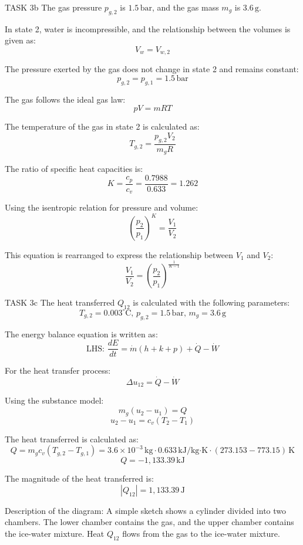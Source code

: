 TASK 3b  
The gas pressure \( p_{g,2} \) is \( 1.5 \, \text{bar} \), and the gas mass \( m_g \) is \( 3.6 \, \text{g} \).  

In state 2, water is incompressible, and the relationship between the volumes is given as:  
\[
V_w = V_{w,2}
\]  

The pressure exerted by the gas does not change in state 2 and remains constant:  
\[
p_{g,2} = p_{g,1} = 1.5 \, \text{bar}
\]  

The gas follows the ideal gas law:  
\[
pV = mRT
\]  

The temperature of the gas in state 2 is calculated as:  
\[
T_{g,2} = \frac{p_{g,2} V_2}{m_g R}
\]  

The ratio of specific heat capacities is:  
\[
K = \frac{c_p}{c_v} = \frac{0.7988}{0.633} = 1.262
\]  

Using the isentropic relation for pressure and volume:  
\[
\left( \frac{p_2}{p_1} \right)^K = \frac{V_1}{V_2}
\]  

This equation is rearranged to express the relationship between \( V_1 \) and \( V_2 \):  
\[
\frac{V_1}{V_2} = \left( \frac{p_2}{p_1} \right)^{\frac{1}{K-1}}
\]  

TASK 3c  
The heat transferred \( Q_{12} \) is calculated with the following parameters:  
\[
T_{g,2} = 0.003^\circ\text{C}, \, p_{g,2} = 1.5 \, \text{bar}, \, m_g = 3.6 \, \text{g}
\]  

The energy balance equation is written as:  
\[
\text{LHS: } \frac{dE}{dt} = \dot{m} (h + k + p) + \dot{Q} - \dot{W}
\]  

For the heat transfer process:  
\[
\Delta u_{12} = \dot{Q} - \dot{W}
\]  

Using the substance model:  
\[
m_g (u_2 - u_1) = Q
\]  
\[
u_2 - u_1 = c_v (T_2 - T_1)
\]  

The heat transferred is calculated as:  
\[
Q = m_g c_v (T_{g,2} - T_{g,1}) = 3.6 \times 10^{-3} \, \text{kg} \cdot 0.633 \, \text{kJ/kg·K} \cdot (273.153 - 773.15) \, \text{K}
\]  
\[
Q = -1,133.39 \, \text{kJ}
\]  

The magnitude of the heat transferred is:  
\[
|Q_{12}| = 1,133.39 \, \text{J}
\]  

Description of the diagram:  
A simple sketch shows a cylinder divided into two chambers. The lower chamber contains the gas, and the upper chamber contains the ice-water mixture. Heat \( Q_{12} \) flows from the gas to the ice-water mixture.